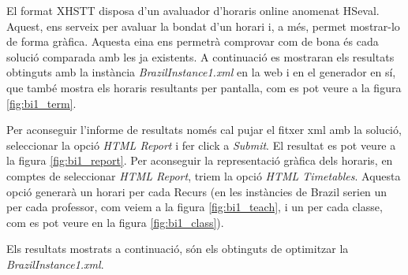 \documentclass[11pt,a4paper,twoside]{report}
\begin{document}
  El format XHSTT disposa d'un avaluador d'horaris online anomenat HSeval\cite{hseval}. Aquest, ens serveix per avaluar la bondat d'un horari i, a més, permet mostrar-lo de forma gràfica. 
  Aquesta eina ens permetrà comprovar com de bona és cada solució comparada amb les ja existents.
  A continuació es mostraran els resultats obtinguts amb la instància \textit{BrazilInstance1.xml} en la web i en el generador en sí, que també mostra els horaris resultants per pantalla, com es pot veure a la figura \ref{fig:bi1_term}. 

  Per aconseguir l'informe de resultats només cal pujar el fitxer xml amb la solució, seleccionar la opció \textit{HTML Report} i fer click a \textit{Submit}. El resultat es pot veure a la figura \ref{fig:bi1_report}.
  Per aconseguir la representació gràfica dels horaris, en comptes de seleccionar \textit{HTML Report}, triem la opció \textit{HTML Timetables}. 
  Aquesta opció generarà un horari per cada Recurs (en les instàncies de Brazil serien un per cada professor, com veiem a la figura \ref{fig:bi1_teach}, i un per cada classe, com es pot veure en la figura \ref{fig:bi1_class}). 

  Els resultats mostrats a continuació, són els obtinguts de optimitzar la \textit{BrazilInstance1.xml}. \newpage
\end{document}
